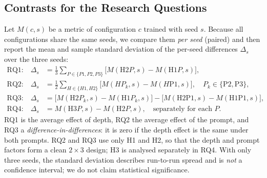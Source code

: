 \documentclass[a4paper,11pt]{article}
\begin{document}
\subsection{Contrasts for the Research Questions}
Let $M(c,s)$ be a metric of configuration $c$ trained with seed $s$. Because all configurations share the same seeds, we compare them \emph{per seed} (paired) and then report the mean and sample standard deviation of the per-seed differences $\Delta_s$ over the three seeds:
\begin{align}
\text{RQ1:}\quad \Delta_s &= \tfrac{1}{3}\textstyle\sum_{P\in\{P1,P2,P3\}}\big[M(\text{H2}P,s)-M(\text{H1}P,s)\big], \\
\text{RQ2:}\quad \Delta_s &= \tfrac{1}{2}\textstyle\sum_{H\in\{H1,H2\}}\big[M(H P_k,s)-M(H\text{P1},s)\big], \quad P_k\in\{\text{P2},\text{P3}\}, \\
\text{RQ3:}\quad \Delta_s &= \big[M(\text{H2}P_k,s)-M(\text{H1}P_k,s)\big]-\big[M(\text{H2P1},s)-M(\text{H1P1},s)\big], \\
\text{RQ4:}\quad \Delta_s &= M(\text{H3}P,s)-M(\text{H2}P,s), \quad \text{separately for each } P.
\end{align}
RQ1 is the average effect of depth, RQ2 the average effect of the prompt, and RQ3 a \emph{difference-in-differences}: it is zero if the depth effect is the same under both prompts. RQ2 and RQ3 use only H1 and H2, so that the depth and prompt factors form a clean $2\times3$ design; H3 is analysed separately in RQ4. With only three seeds, the standard deviation describes run-to-run spread and is \emph{not} a confidence interval; we do not claim statistical significance.
\end{document}
